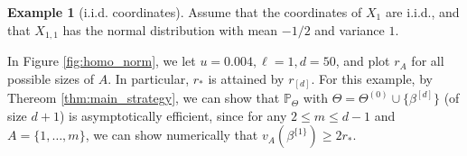 \documentclass[aap,preprint]{imsart}
\newcommand{\Pro}{{\mathbb{P}}}
\theoremstyle{plain}
\theoremstyle{definition}
\newtheorem{example}{Example}
\begin{document}
\begin{example}[i.i.d. coordinates] Assume that the coordinates of $X_1$ are i.i.d., and that $X_{1,1}$ has the normal distribution with mean $-1/2$ and variance $1$. 


In Figure \ref{fig:homo_norm}, we let $u = 0.004, \ell = 1, d=50$, and plot $r_A$ for all possible sizes of $A$. In particular, $r_*$ is attained by $r_{[d]}$. For this example, by Thereom \ref{thm:main_strategy}, we can show that $\Pro_{\Theta}$ with $\Theta = \Theta^{(0)} \cup \{\beta^{[d]}\}$ (of size $d+1$) is asymptotically efficient, since for any $2 \leq m \leq d-1$ and $A =\{1,\ldots,m\}$, we can show numerically that
$    
v_A(\beta^{\{1\}})
\geq 2r_*.
$
\end{example}



\end{document}
